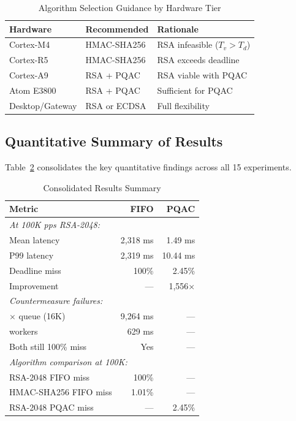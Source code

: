 \documentclass[journal]{IEEEtran}
\begin{document}
\begin{table}[t]
\caption{Algorithm Selection Guidance by Hardware Tier}
\label{tab:algo_guidance}
\centering
\small
\begin{tabular}{lll}
\toprule
\textbf{Hardware} & \textbf{Recommended} & \textbf{Rationale} \\
\midrule
Cortex-M4 & HMAC-SHA256 & RSA infeasible ($T_v > T_d$) \\
Cortex-R5 & HMAC-SHA256 & RSA exceeds deadline \\
Cortex-A9 & RSA + PQAC & RSA viable with PQAC \\
Atom E3800 & RSA + PQAC & Sufficient for PQAC \\
Desktop/Gateway & RSA or ECDSA & Full flexibility \\
\bottomrule
\end{tabular}
\end{table}

\subsection{Quantitative Summary of Results}
Table~\ref{tab:summary_results} consolidates the key quantitative findings across all 15 experiments.

\begin{table}[t]
\caption{Consolidated Results Summary}
\label{tab:summary_results}
\centering
\small
\begin{tabular}{lrr}
\toprule
\textbf{Metric} & \textbf{FIFO} & \textbf{PQAC} \\
\midrule
\multicolumn{3}{l}{\textit{At 100K pps RSA-2048:}} \\
\quad Mean latency & 2,318 ms & 1.49 ms \\
\quad P99 latency & 2,319 ms & 10.44 ms \\
\quad Deadline miss & 100\% & 2.45\% \\
\quad Improvement & --- & 1,556$\times$ \\
\midrule
\multicolumn{3}{l}{\textit{Countermeasure failures:}} \\
\quad 4$\times$ queue (16K) & 9,264 ms & --- \\
\quad 4 workers & 629 ms & --- \\
\quad Both still 100\% miss & Yes & --- \\
\midrule
\multicolumn{3}{l}{\textit{Algorithm comparison at 100K:}} \\
\quad RSA-2048 FIFO miss & 100\% & --- \\
\quad HMAC-SHA256 FIFO miss & 1.01\% & --- \\
\quad RSA-2048 PQAC miss & --- & 2.45\% \\
\bottomrule
\end{tabular}
\end{table}
\end{document}
